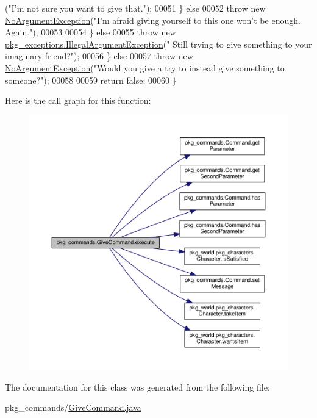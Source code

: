 \begin{DoxyCode}
      (\textcolor{stringliteral}{"I'm not sure you want to give that."});
00051                 \} \textcolor{keywordflow}{else}
00052                     \textcolor{keywordflow}{throw} \textcolor{keyword}{new} \hyperlink{classpkg__exceptions_1_1NoArgumentException}{NoArgumentException}(\textcolor{stringliteral}{"I'm afraid giving yourself to this
       one won't be enough. Again."});
00053 
00054             \} \textcolor{keywordflow}{else}
00055                 \textcolor{keywordflow}{throw} \textcolor{keyword}{new} \hyperlink{classpkg__exceptions_1_1IllegalArgumentException}{pkg\_exceptions.IllegalArgumentException}(\textcolor{stringliteral}{"
      Still trying to give something to your imaginary friend?"});
00056         \} \textcolor{keywordflow}{else}
00057             \textcolor{keywordflow}{throw} \textcolor{keyword}{new} \hyperlink{classpkg__exceptions_1_1NoArgumentException}{NoArgumentException}(\textcolor{stringliteral}{"Would you give a try to instead give
       something to someone?"});
00058 
00059         \textcolor{keywordflow}{return} \textcolor{keyword}{false};
00060     \}
\end{DoxyCode}


Here is the call graph for this function\-:
\nopagebreak
\begin{figure}[H]
\begin{center}
\leavevmode
\includegraphics[width=350pt]{classpkg__commands_1_1GiveCommand_a3a3cca7fae9b86d8ff85cc166564843d_cgraph}
\end{center}
\end{figure}




The documentation for this class was generated from the following file\-:\begin{DoxyCompactItemize}
\item 
pkg\-\_\-commands/\hyperlink{GiveCommand_8java}{Give\-Command.\-java}\end{DoxyCompactItemize}
